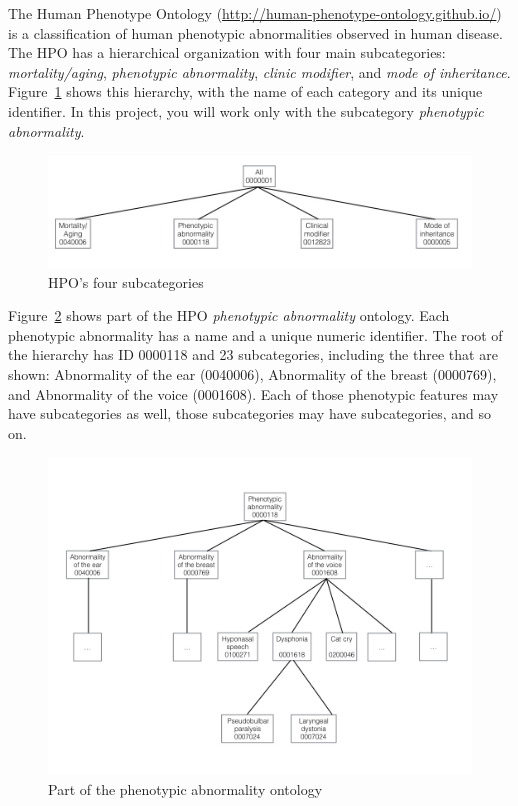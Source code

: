 \documentclass[a4paper]{article}
\begin{document}
The Human Phenotype Ontology (\url{http://human-phenotype-ontology.github.io/}) is a classification of human phenotypic abnormalities observed in human disease.  The HPO has a hierarchical organization  with four main subcategories: \textit{mortality/aging}, \textit{phenotypic abnormality}, \textit{clinic modifier}, and 
\textit{mode of inheritance}.  Figure~\ref{four} shows this hierarchy, with the name of each category and its unique identifier. In this project, you will work only with the subcategory \textit{phenotypic abnormality}.

\begin{center}
\begin{figure}[h]
\includegraphics[width=5in]{ontology_four_categories.jpeg}
\caption{HPO's four subcategories}
\label{four}
\end{figure}
\end{center}

Figure~\ref{abnormalities} shows part of the HPO \textit{phenotypic abnormality} ontology.  Each phenotypic abnormality has a name and a unique numeric identifier.  The root of the hierarchy has ID 0000118 and 23 subcategories, including the three that are shown: Abnormality of the ear (0040006), Abnormality of the breast (0000769), and Abnormality of the voice (0001608).  Each of those phenotypic features may have subcategories as well, those subcategories may have subcategories, and so on.  
\begin{center}
\begin{figure}[h]
\includegraphics[width=6in]{ontology_img.jpeg}
\caption{Part of the phenotypic abnormality ontology}
\label{abnormalities}
\end{figure}
\end{center}
\end{document}
